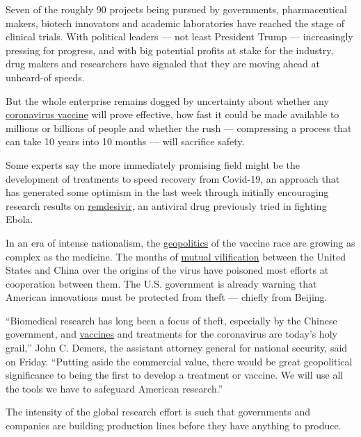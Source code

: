 Seven of the roughly 90 projects being pursued by governments,
pharmaceutical makers, biotech innovators and academic laboratories have
reached the stage of clinical trials. With political leaders --- not
least President Trump --- increasingly pressing for progress, and with
big potential profits at stake for the industry, drug makers and
researchers have signaled that they are moving ahead at unheard-of
speeds.

But the whole enterprise remains dogged by uncertainty about whether any
\href{https://www.nytimes.com/2020/05/20/health/coronavirus-vaccines.html}{coronavirus
vaccine} will prove effective, how fast it could be made available to
millions or billions of people and whether the rush --- compressing a
process that can take 10 years into 10 months --- will sacrifice safety.

Some experts say the more immediately promising field might be the
development of treatments to speed recovery from Covid-19, an approach
that has generated some optimism in the last week through initially
encouraging research results on
\href{https://www.nytimes.com/2020/04/29/health/gilead-remdesivir-coronavirus.html}{remdesivir},
an antiviral drug previously tried in fighting Ebola.

In an era of intense nationalism, the
\href{https://www.nytimes.com/2020/03/19/us/politics/coronavirus-vaccine-competition.html}{geopolitics}
of the vaccine race are growing as complex as the medicine. The months
of
\href{https://www.nytimes.com/2020/05/01/us/politics/coronavirus-china-trump.html}{mutual
vilification} between the United States and China over the origins of
the virus have poisoned most efforts at cooperation between them. The
U.S. government is already warning that American innovations must be
protected from theft --- chiefly from Beijing.

``Biomedical research has long been a focus of theft, especially by the
Chinese government, and
\href{https://www.nytimes.com/2020/05/15/us/politics/coronavirus-vaccine-timeline.html}{vaccines}
and treatments for the coronavirus are today's holy grail,'' John C.
Demers, the assistant attorney general for national security, said on
Friday. ``Putting aside the commercial value, there would be great
geopolitical significance to being the first to develop a treatment or
vaccine. We will use all the tools we have to safeguard American
research.''

The intensity of the global research effort is such that governments and
companies are building production lines before they have anything to
produce.

